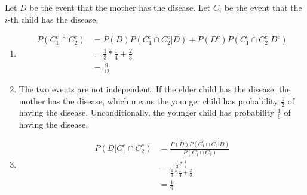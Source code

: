 Let $D$ be the event that the mother has the disease. Let $C_{i}$ be the event
that the $i$-th child has the disease.

\begin{enumerate}[label=(\alph*)]
\item 
\begin{align*}
P(C_{1}^{c} \cap C_{2}^{c}) &= P(D)P(C_{1}^{c} \cap C_{2}^{c} | D) + P(D^{c})P
(C_{1}^{c} \cap C_{2}^{c} | D^{c}) \\
&= \frac{1}{3}*\frac{1}{4} + \frac{2}{3} \\
&= \frac{9}{12}
\end{align*}

\item The two events are not independent. If the elder child has the disease,
the mother has the disease, which means the younger child has probability $
\frac{1}{2}$ of having the disease. Unconditionally, the younger child has
probability $\frac{1}{6}$ of having the disease.

\item
\begin{align*}
P(D|C_{1}^{c} \cap C_{2}^{c}) &= \frac{P(D)P(C_{1}^{c} \cap C_{2}^{c} | D)}{P
(C_{1}^{c} \cap C_{2}^{c})} \\
&= \frac{\frac{1}{3}*\frac{1}{4}}{\frac{1}{3}*\frac{1}{4} + \frac{2}{3}} \\
&= \frac{1}{9}
\end{align*}
\end{enumerate}